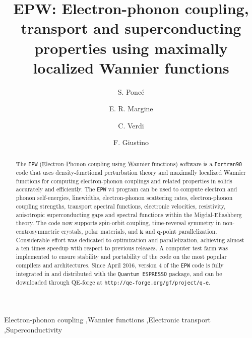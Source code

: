 \documentclass[final,3p,times,twocolumn]{elsarticle}
\begin{document}



\begin{frontmatter}

\title{EPW: Electron-phonon coupling, transport and superconducting properties using maximally localized Wannier functions}

\author[oxford]{S. Ponc\'e }
\author[binghamton]{E. R. Margine }
\author[oxford]{C. Verdi}
\author[oxford]{F. Giustino}

\address[oxford]{Department of Materials, University of Oxford, Parks Road, Oxford, OX1 3PH, UK}
\address[binghamton]{Department of Physics, Applied Physics and Astronomy, Binghamton University-SUNY, Binghamton, New York 13902, USA}



\begin{abstract}
The \texttt{EPW} (\underline{E}lectron-\underline{P}honon coupling using \underline{W}annier functions) software is a \texttt{Fortran90} code that uses density-functional perturbation theory and maximally localized Wannier functions for computing
electron-phonon couplings and related properties in solids accurately and efficiently.
The \texttt{EPW} v4 program can be used to compute electron and phonon self-energies, linewidths, electron-phonon scattering rates, electron-phonon coupling strengths, transport spectral functions, electronic velocities, resistivity, anisotropic superconducting gaps and spectral functions within the Migdal-Eliashberg theory.
The code now supports spin-orbit coupling, time-reversal symmetry in non-centrosymmetric crystals, polar materials, and $\mathbf{k}$ and $\mathbf{q}$-point parallelization.
Considerable effort was dedicated to optimization and parallelization, achieving almost a ten times speedup with respect to previous releases.
A computer test farm was implemented to ensure stability and portability of the code on the most popular compilers and architectures. 
Since April 2016, version 4 of the \texttt{EPW} code is fully integrated in and distributed with the \texttt{Quantum ESPRESSO} package, and can be downloaded through QE-forge at \texttt{http://qe-forge.org/gf/project/q-e}. 
\end{abstract}


\begin{keyword}
     Electron-phonon coupling  \sep  Wannier functions \sep Electronic transport \sep Superconductivity
\end{keyword}

\end{frontmatter}
\end{document}
